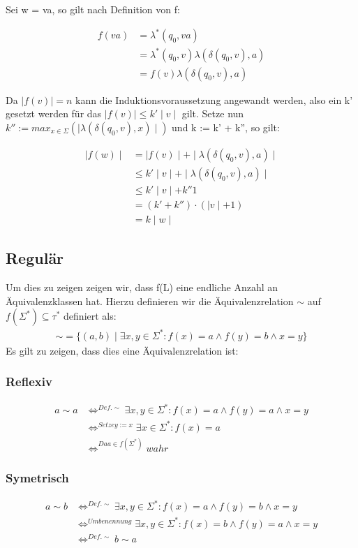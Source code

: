 \documentclass[12pt, a4paper]{article}
\begin{document}
Sei w = va, so gilt nach Definition von f:

\begin{align*}
f(va) &= \lambda^*(q_0, va) \\
&= \lambda^*(q_0, v) \lambda(\delta(q_0,v), a) \\
&= f(v)  \lambda(\delta(q_0,v), a)
\end{align*}

Da $\mid f(v) \mid = n$ kann die Induktionsvoraussetzung angewandt werden, also ein k' gesetzt werden für das $\mid f(v) \mid \le k' \mid v \mid$ gilt. Setze nun $k'' := max_{x \in \Sigma}(\mid \lambda(\delta(q_0,v),x) \mid )$ und k := k' + k'', so gilt:

\begin{align*}
\mid f(w) \mid &= \mid f(v) \mid + \mid \lambda(\delta(q_0,v),a) \mid \\
&\le k' \mid v \mid + \mid \lambda(\delta(q_0,v),a) \mid \\
&\le k' \mid v \mid + k'' 1 \\
&= (k' + k'') \cdot (\mid v \mid + 1) \\
&= k \mid w \mid
\end{align*}

\subsection*{Regulär}
Um dies zu zeigen zeigen wir, dass f(L) eine endliche Anzahl an Äquivalenzklassen hat. Hierzu definieren wir die Äquivalenzrelation $\sim$ auf $f(\Sigma^*)\subseteq \tau^*$ definiert als:
\begin{align*}
\sim = \{(a,b) \mid \exists x,y \in \Sigma^*: f(x) = a \wedge f(y) = b \wedge x = y \}
\end{align*}
Es gilt zu zeigen, dass dies eine Äquivalenzrelation ist:

\subsubsection*{Reflexiv}
\begin{align*}
a \sim a &\Longleftrightarrow^{Def. \sim} \exists x,y \in \Sigma^*: f(x) = a \wedge f(y) = a \wedge x = y \\
&\Longleftrightarrow^{Setze y := x} \exists x \in \Sigma^*: f(x) = a \\
&\Longleftrightarrow^{Da a \in f(\Sigma^*)} wahr
\end{align*}

\subsubsection*{Symetrisch}
\begin{align*}
a \sim b &\Longleftrightarrow^{Def. \sim} \exists x,y \in \Sigma^*:  f(x) = a \wedge f(y) = b \wedge x = y \\
&\Longleftrightarrow^{Umbenennung} \exists x,y \in \Sigma^*:  f(x) = b \wedge f(y) = a \wedge x = y \\
&\Longleftrightarrow^{Def. \sim} b \sim a
\end{align*}
\end{document}
